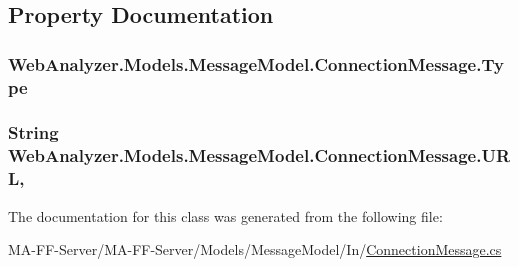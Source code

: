 \subsection{Property Documentation}
\hypertarget{class_web_analyzer_1_1_models_1_1_message_model_1_1_connection_message_a74c569109e3a9d19130c36fa9628a5f5}{}
\subsubsection[{Type}]{ Web\+Analyzer.\+Models.\+Message\+Model.\+Connection\+Message.\+Type\hspace{0.3cm}{\ttfamily [get]}}\label{class_web_analyzer_1_1_models_1_1_message_model_1_1_connection_message_a74c569109e3a9d19130c36fa9628a5f5}
\hypertarget{class_web_analyzer_1_1_models_1_1_message_model_1_1_connection_message_afc9df7636f98ce36f983c89db64f1c6a}{}
\subsubsection[{U\+R\+L}]{\setlength{\rightskip}{0pt plus 5cm}String Web\+Analyzer.\+Models.\+Message\+Model.\+Connection\+Message.\+U\+R\+L\hspace{0.3cm}{\ttfamily [get]}, {\ttfamily [set]}}\label{class_web_analyzer_1_1_models_1_1_message_model_1_1_connection_message_afc9df7636f98ce36f983c89db64f1c6a}


The documentation for this class was generated from the following file\+:\begin{DoxyCompactItemize}
\item 
M\+A-\/\+F\+F-\/\+Server/\+M\+A-\/\+F\+F-\/\+Server/\+Models/\+Message\+Model/\+In/\hyperlink{_connection_message_8cs}{Connection\+Message.\+cs}\end{DoxyCompactItemize}

